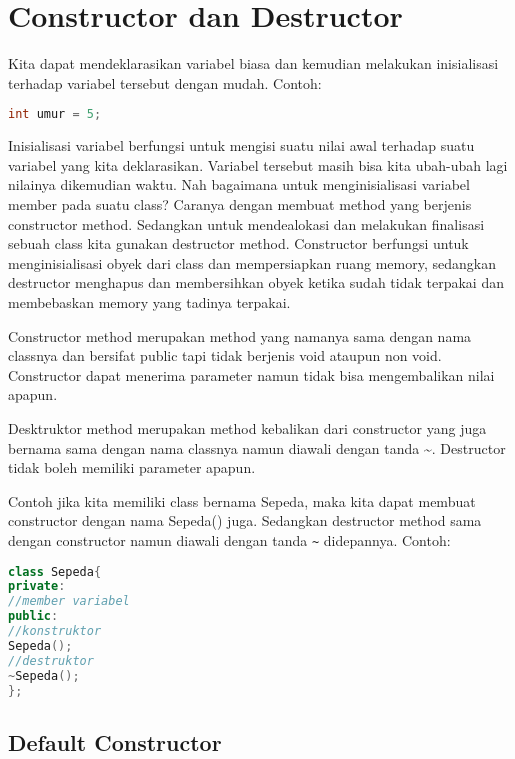 \section{Constructor dan
Destructor}\label{constructor-dan-destructor}

Kita dapat mendeklarasikan variabel biasa dan kemudian melakukan
inisialisasi terhadap variabel tersebut dengan mudah. Contoh:

\begin{lstlisting}[language=c++, numbers=none]
int umur = 5;
\end{lstlisting}

Inisialisasi variabel berfungsi untuk mengisi suatu nilai awal terhadap
suatu variabel yang kita deklarasikan. Variabel tersebut masih bisa kita
ubah-ubah lagi nilainya dikemudian waktu. Nah bagaimana untuk
menginisialisasi variabel member pada suatu class? Caranya dengan
membuat method yang berjenis constructor method. Sedangkan untuk
mendealokasi dan melakukan finalisasi sebuah class kita gunakan
destructor method. Constructor berfungsi untuk menginisialisasi obyek
dari class dan mempersiapkan ruang memory, sedangkan destructor
menghapus dan membersihkan obyek ketika sudah tidak terpakai dan
membebaskan memory yang tadinya terpakai.

Constructor method merupakan method yang namanya sama dengan nama
classnya dan bersifat public tapi tidak berjenis void ataupun non void.
Constructor dapat menerima parameter namun tidak bisa mengembalikan
nilai apapun.

Desktruktor method merupakan method kebalikan dari constructor yang juga
bernama sama dengan nama classnya namun diawali dengan tanda
\textasciitilde{}. Destructor tidak boleh memiliki parameter apapun.

Contoh jika kita memiliki class bernama Sepeda, maka kita dapat membuat
constructor dengan nama Sepeda() juga. Sedangkan destructor method sama
dengan constructor namun diawali dengan tanda \texttt{\textasciitilde{}}
didepannya. Contoh:

\begin{lstlisting}[language=c++, numbers=none]
class Sepeda{
private:
//member variabel
public:
//konstruktor
Sepeda();
//destruktor
~Sepeda();
};
\end{lstlisting}

\subsection{Default Constructor}\label{default-constructor}

